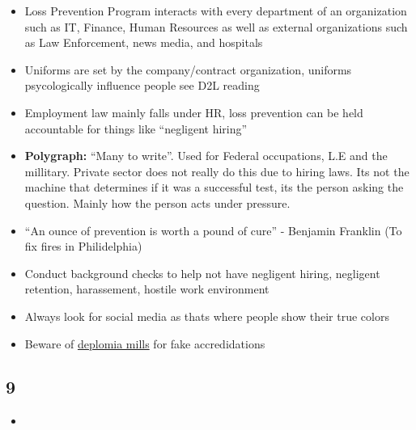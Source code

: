 \documentclass[12pt]{article}
\begin{document}
\begin{itemize}
		   \item Loss Prevention Program interacts with every department of an organization such as IT, Finance,
		  		Human Resources as well as external organizations such as Law Enforcement, news media, and hospitals
			\item Uniforms are set by the company/contract organization, uniforms psycologically influence
				people see D2L reading
			\item Employment law mainly falls under HR, loss prevention can be held accountable for things like
				``negligent hiring''
			\item \textbf{Polygraph:} ``Many to write''. Used for Federal occupations, L.E and the millitary.
				Private sector does not really do this due to hiring laws. Its not the machine that determines
				if it was a successful test, its the person asking the question. Mainly how the person acts under
				pressure.
			\item ``An ounce of prevention is worth a pound of cure'' - Benjamin Franklin 
				(To fix fires in Philidelphia)
		   \item Conduct background checks to help not have negligent hiring, negligent retention, harassement,
				hostile work environment
			\item Always look for social media as thats where people show their true colors
			\item Beware of \underline{deplomia mills} for fake accredidations
\end{itemize}

\subsection*{9}

\begin{itemize}
		  \item 
\end{itemize}
\end{document}
